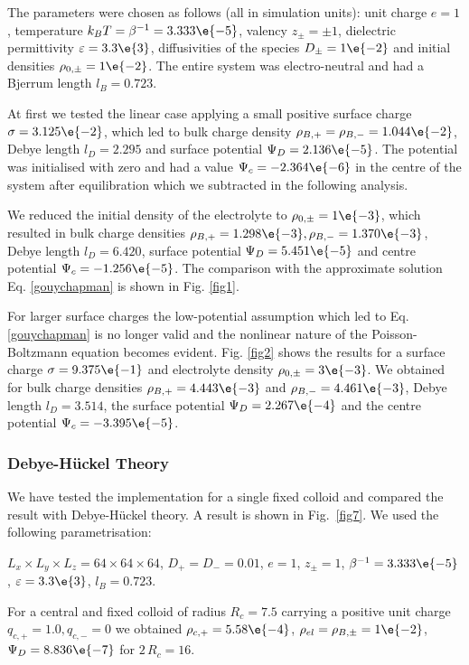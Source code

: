  
The parameters were chosen as follows (all in simulation units):
unit charge $e=1$, temperature $k_B T=\beta^{-1}=3.333\e{-5}$, valency $z_{\pm}=\pm1$, 
dielectric permittivity $\varepsilon=3.3\e{3}$, diffusivities 
of the species $D_{\pm}=1\e{-2}$ and initial densities $\rho_{0,\pm}=1\e{-2}$.
The entire system was electro-neutral and had a Bjerrum length $l_B=0.723$.

At first we tested the linear case applying a small positive surface charge
$\sigma=3.125\e{-2}$, which led to bulk charge density $\rho_{B,+}=\rho_{B,-}=1.044\e{-2}$, 
Debye length $l_D=2.295$ and surface potential $\Psi_D=2.136\e{-5}$.
The potential was initialised with zero and had a value $\Psi_c=-2.364\e{-6}$ 
in the centre of the system after equilibration which we subtracted in the 
following analysis.

We reduced the initial density of the electrolyte to $\rho_{0,\pm}=1\e{-3}$,
which resulted in bulk charge densities  
$\rho_{B,+}=1.298\e{-3}, \rho_{B,-}=1.370\e{-3}$, 
Debye length $l_D=6.420$, surface potential $\Psi_D=5.451\e{-5}$
and centre potential $\Psi_c=-1.256\e{-5}$.
The comparison with the approximate solution Eq. \ref{gouychapman} is shown 
in Fig. \ref{fig1}.

For larger surface charges the low-potential assumption which led to Eq. \ref{gouychapman}
is no longer valid and the nonlinear nature of the Poisson-Boltzmann 
equation becomes evident.
Fig. \ref{fig2} shows the results for a surface charge $\sigma=9.375\e{-1}$
and electrolyte density $\rho_{0,\pm}=3\e{-3}$. We obtained for   
bulk charge densities $\rho_{B,+}=4.443\e{-3}$ and $\rho_{B,-}=4.461\e{-3}$, 
Debye length $l_D=3.514$, the surface potential $\Psi_D=2.267\e{-4}$
and the centre potential $\Psi_c=-3.395\e{-5}$. 


\subsubsection{Debye-H\"uckel Theory}

We have tested the implementation for a single fixed
colloid and compared the result with Debye-H\"uckel theory. A result
is shown in Fig.~\ref{fig7}.
We used the following parametrisation:

$L_x \times L_y \times L_z=64\times64\times64$,
$D_+=D_-=0.01$,
$e=1$, 
$z_{\pm}=1$,
$\beta^{-1}=3.333\e{-5}$,
$\varepsilon=3.3\e{3}$,
$l_B=0.723$.

For a central and fixed colloid of radius $R_c=7.5$ carrying a positive unit charge
$q_{c,+}=1.0, q_{c,-}=0$ we obtained 
$\rho_{c,+}=5.58\e{-4}$,
$\rho_{el}=\rho_{B,\pm}=1\e{-2}$, 
$\Psi_D=8.836\e{-7}$ for $2\,R_c=16$.

